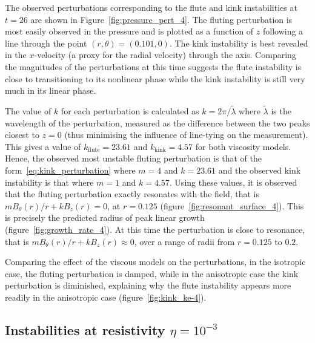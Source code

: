 \documentclass[fleqn,usenatbib]{mnras}
\begin{document}
The observed perturbations corresponding to the flute and kink instabilities at
$t=26$ are shown in Figure~\ref{fig:pressure_pert_4}. The fluting perturbation
is most easily observed in the pressure and is plotted as a function of $z$
following a line through the point $(r, \theta) = (0.101, 0)$. The kink
instability is best revealed in the $x$-velocity (a proxy for the radial
velocity) through the axis. Comparing the magnitudes of the perturbations at
this time suggests the flute instability is close to transitioning to its
nonlinear phase while the kink instability is still very much in its linear
phase.

The value of $k$ for each perturbation is calculated as $k
= 2\pi/\tilde{\lambda}$ where $\tilde{\lambda}$ is the wavelength of the
perturbation, measured as the difference between the two peaks closest to $z=0$
(thus minimising the influence of line-tying on the measurement). This gives
a value of $k_{\text{flute}}=23.61$ and $k_{\text{kink}}=4.57$ for both
viscosity models. Hence, the observed most unstable fluting perturbation is
that of the form~\eqref{eq:kink_perturbation} where $m=4$ and $k=23.61$ and the
observed kink instability is that where $m=1$ and $k=4.57$. Using these values,
it is observed that the fluting perturbation exactly resonates with the field,
that is $m B_{\theta}(r)/r + kB_z(r) = 0$, at $r=0.125$
(figure~\ref{fig:resonant_surface_4}). This is precisely the predicted radius
of peak linear growth (figure~\ref{fig:growth_rate_4}). At this time the
perturbation is close to resonance, that is $m B_{\theta}(r)/r + kB_z(r)
\approx 0$, over a range of radii from $r=0.125$ to $0.2$.

Comparing the effect of the viscous models on the perturbations, in the
isotropic case, the fluting perturbation is damped, while in the anisotropic
case the kink perturbation is diminished, explaining why the flute instability
appears more readily in the anisotropic case (figure~\ref{fig:kink_ke-4}).

\subsection{Instabilities at resistivity $\eta=10^{-3}$}
\end{document}

